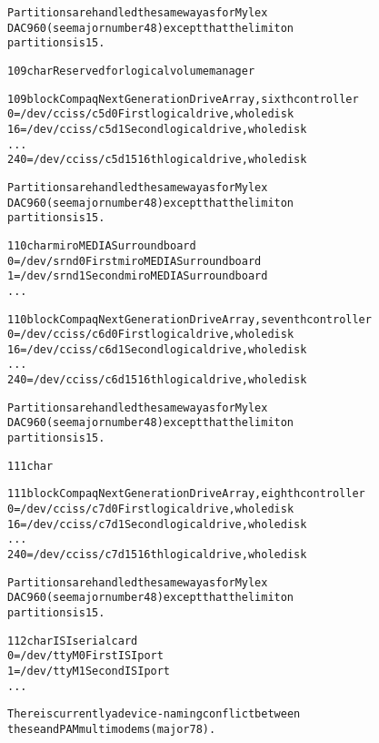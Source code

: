 \documentclass[a4paper,8pt,english]{sphinxmanual}
\begin{document}
\begin{alltt}
                Partitions are handled the same way as for Mylex
                DAC960 (see major number 48) except that the limit on
                partitions is 15.

 109 char       Reserved for logical volume manager

 109 block      Compaq Next Generation Drive Array, sixth controller
                  0 = /dev/cciss/c5d0   First logical drive, whole disk
                 16 = /dev/cciss/c5d1   Second logical drive, whole disk
                    ...
                240 = /dev/cciss/c5d15  16th logical drive, whole disk

                Partitions are handled the same way as for Mylex
                DAC960 (see major number 48) except that the limit on
                partitions is 15.

 110 char       miroMEDIA Surround board
                  0 = /dev/srnd0        First miroMEDIA Surround board
                  1 = /dev/srnd1        Second miroMEDIA Surround board
                    ...

 110 block      Compaq Next Generation Drive Array, seventh controller
                  0 = /dev/cciss/c6d0   First logical drive, whole disk
                 16 = /dev/cciss/c6d1   Second logical drive, whole disk
                    ...
                240 = /dev/cciss/c6d15  16th logical drive, whole disk

                Partitions are handled the same way as for Mylex
                DAC960 (see major number 48) except that the limit on
                partitions is 15.

 111 char

 111 block      Compaq Next Generation Drive Array, eighth controller
                  0 = /dev/cciss/c7d0   First logical drive, whole disk
                 16 = /dev/cciss/c7d1   Second logical drive, whole disk
                    ...
                240 = /dev/cciss/c7d15  16th logical drive, whole disk

                Partitions are handled the same way as for Mylex
                DAC960 (see major number 48) except that the limit on
                partitions is 15.

 112 char       ISI serial card
                  0 = /dev/ttyM0        First ISI port
                  1 = /dev/ttyM1        Second ISI port
                    ...

                There is currently a device-naming conflict between
                these and PAM multimodems (major 78).


\end{alltt}
\end{document}

